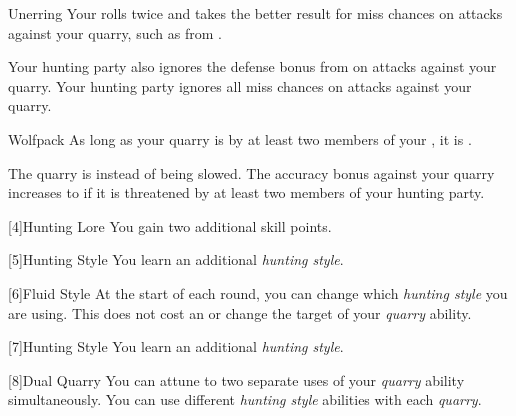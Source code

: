 {            \begin{freeability}{Unerring}
                Your  rolls twice and takes the better result for miss chances on attacks against your quarry, such as from .

                \rankline
                 Your hunting party also ignores the defense bonus from  on attacks against your quarry.
                 Your hunting party ignores all miss chances on attacks against your quarry.
            \end{freeability}

            \begin{freeability}{Wolfpack}
                As long as your quarry is  by at least two members of your , it is .

                \rankline
                 The quarry is  instead of being slowed.
                 The accuracy bonus against your quarry increases to  if it is threatened by at least two members of your hunting party.
            \end{freeability}
        }

        [4]{Hunting Lore} You gain two additional skill points.

        [5]{Hunting Style}
        You learn an additional \textit{hunting style}.

        [6]{Fluid Style}
        At the start of each round, you can change which \textit{hunting style} you are using.
        This does not cost an  or change the target of your \textit{quarry} ability.

        [7]{Hunting Style}
        You learn an additional \textit{hunting style}.

        [8]{Dual Quarry} You can attune to two separate uses of your \textit{quarry} ability simultaneously.
        You can use different \textit{hunting style} abilities with each \textit{quarry}.

\newpage
